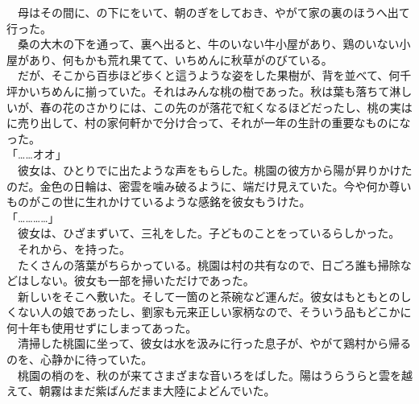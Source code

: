 \documentclass[
  paper=a5,
  fontsize=10pt,
  jafontsize=9.5pt,
  tate,                  %
  open_bracket_pos=nibu, %
]{jlreq}
\begin{document}
　母はその間に、の下にをいて、朝のぎをしておき、やがて家の裏のほうへ出て行った。\\


　桑の大木の下を通って、裏へ出ると、牛のいない牛小屋があり、鶏のいない小屋があり、何もかも荒れ果てて、いちめんに秋草がのびている。\\


　だが、そこから百歩ほど歩くと這うような姿をした果樹が、背を並べて、何千坪かいちめんに揃っていた。それはみんな桃の樹であった。秋は葉も落ちて淋しいが、春の花のさかりには、この先のが落花で紅くなるほどだったし、桃の実はに売り出して、村の家何軒かで分け合って、それが一年の生計の重要なものになった。\\


「……オオ」\\


　彼女は、ひとりでに出たような声をもらした。桃園の彼方から陽が昇りかけたのだ。金色の日輪は、密雲を噛み破るように、端だけ見えていた。今や何か尊いものがこの世に生れかけているような感銘を彼女もうけた。\\


「…………」\\


　彼女は、ひざまずいて、三礼をした。子どものことをっているらしかった。\\


　それから、を持った。\\


　たくさんの落葉がちらかっている。桃園は村の共有なので、日ごろ誰も掃除などはしない。彼女も一部を掃いただけであった。\\


　新しいをそこへ敷いた。そして一箇のと茶碗など運んだ。彼女はもともとのしくない人の娘であったし、劉家も元来正しい家柄なので、そういう品もどこかに何十年も使用せずにしまってあった。\\


　清掃した桃園に坐って、彼女は水を汲みに行った息子が、やがて鶏村から帰るのを、心静かに待っていた。\\


　桃園の梢のを、秋のが来てさまざまな音いろをばした。陽はうらうらと雲を越えて、朝霧はまだ紫ばんだまま大陸によどんでいた。\\
\end{document}
